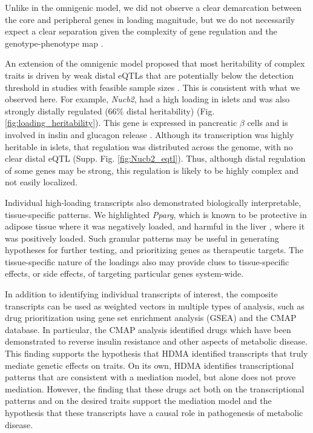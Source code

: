 \documentclass[
]{article}
\begin{document}
Unlike in the omnigenic model, we did not observe a clear demarcation
between the core and peripheral genes in loading magnitude, but we do
not necessarily expect a clear separation given the complexity of gene
regulation and the genotype-phenotype map \cite{pmid29906445}.

An extension of the omnigenic model proposed that most heritability of
complex traits is driven by weak distal eQTLs that are potentially below
the detection threshold in studies with feasible sample sizes
\cite{pmid31051098}. This is consistent with what we observed here. For
example, \textit{Nucb2}, had a high loading in islets and was also
strongly distally regulated (66\% distal heritability) (Fig.
\ref{fig:loading_heritability}). This gene is expressed in pancreatic
\(\beta\) cells and is involved in inslin and glucagon release
\cite{pmid24993278, pmid23537085, pmid22108805}. Although its
transcription was highly heritable in islets, that regulation was
distributed across the genome, with no clear distal eQTL (Supp. Fig.
\ref{fig:Nucb2_eqtl}). Thus, although distal regulation of some genes
may be strong, this regulation is likely to be highly complex and not
easily localized.

Individual high-loading transcripts also demonstrated biologically
interpretable, tissue-specific patterns. We highlighted \textit{Pparg},
which is known to be protective in adipose tissue \cite{pmid17389767}
where it was negatively loaded, and harmful in the liver
\cite{pmid12805374, pmid12618528, 
pmid16357043, pmid15644454, pmid16403437}, where it was positively
loaded. Such granular patterns may be useful in generating hypotheses
for further testing, and prioritizing genes as therapeutic targets. The
tissue-specific nature of the loadings also may provide clues to
tissue-specific effects, or side effects, of targeting particular genes
system-wide.

In addition to identifying individual transcripts of interest, the
composite transcripts can be used as weighted vectors in multiple types
of analysis, such as drug prioritization using gene set enrichment
analysis (GSEA) and the CMAP database. In particular, the CMAP analysis
identified drugs which have been demonstrated to reverse insulin
resistance and other aspects of metabolic disease. This finding supports
the hypothesis that HDMA identified transcripts that truly mediate
genetic effects on traits. On its own, HDMA identifies transcriptional
patterns that are consistent with a mediation model, but alone does not
prove mediation. However, the finding that these drugs act both on the
transcriptional patterns and on the desired traits support the mediation
model and the hypothesis that these transcripts have a causal role in
pathogenesis of metabolic disease.
\end{document}
